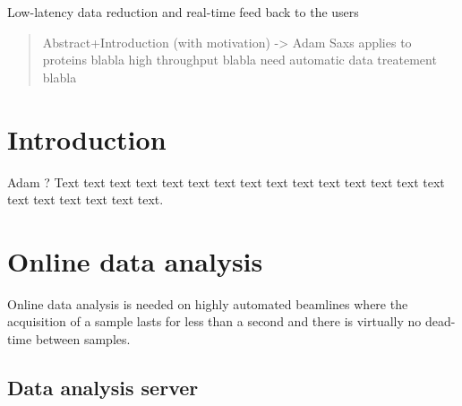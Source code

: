\documentclass[preprint]{iucr}              %
\begin{document}
\maketitle                        %

\begin{synopsis}
Low-latency data reduction and real-time feed back to the users 
\end{synopsis}

\begin{abstract}
Abstract+Introduction (with motivation) -> Adam
Saxs applies to proteins blabla
high throughput blabla
need automatic data treatement blabla
\end{abstract}



\section{Introduction}

Adam ?
Text text text text text text text text text text text text text text
text text text text text text text.



\section{Online data analysis}

Online data analysis is needed on highly automated beamlines where the
acquisition of a sample lasts for less than a second and there is virtually no
dead-time between samples.

\subsection{Data analysis server}
\end{document}
